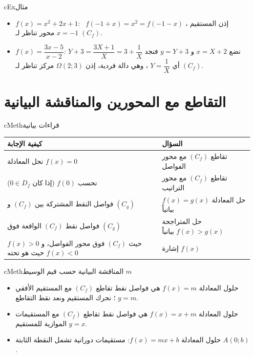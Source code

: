 \documentclass[12pt,a4paper]{article}
\newenvironment{BOX}[2]{\begin{otherlanguage}{english}\begin{arbox}{#1}{#2}}{\end{arbox}\end{otherlanguage}}
\newenvironment{mithal}[1][مثال]{\begin{BOX}{cEx}{#1}}{\end{BOX}}
\newenvironment{tariqa}[1][طريقة]{\begin{BOX}{cMeth}{#1}}{\end{BOX}}
\begin{document}
\begin{mithal}
\begin{itemize}
\item $f(x)=x^2+2x+1$: \ $f(-1+x)=x^2=f(-1-x)$ ، إذن المستقيم $x=-1$ محور تناظر لـ $(C_f)$.
\item $f(x)=\dfrac{3x-5}{x-2}$: نضع $x=X+2$ و $y=Y+3$ فنجد $Y+3=\dfrac{3X+1}{X}=3+\dfrac1X$ أي $Y=\dfrac1X$ ،
وهي دالة فردية، إذن $\Omega(2;3)$ مركز تناظر لـ $(C_f)$.
\end{itemize}
\end{mithal}

\section{التقاطع مع المحورين والمناقشة البيانية}
\begin{tariqa}[قراءات بيانية]
\begin{center}
\renewcommand{\arraystretch}{1.5}
\begin{tabular}{|>{\centering\arraybackslash}m{10.2cm}|>{\centering\arraybackslash}m{5cm}|}\hline
\textbf{كيفية الإجابة} & \textbf{السؤال}\\\hline
نحل المعادلة $f(x)=0$ & تقاطع $(C_f)$ مع محور الفواصل\\\hline
نحسب $f(0)$ (إذا كان $0\in D_f$) & تقاطع $(C_f)$ مع محور التراتيب\\\hline
فواصل النقط المشتركة بين $(C_f)$ و $(C_g)$ & حل المعادلة $f(x)=g(x)$ بيانياً\\\hline
فواصل نقط $(C_f)$ الواقعة فوق $(C_g)$ & حل المتراجحة $f(x)>g(x)$ بيانياً\\\hline
$f(x)>0$ حيث $(C_f)$ فوق محور الفواصل، و $f(x)<0$ حيث هو تحته & إشارة $f(x)$\\\hline
\end{tabular}
\end{center}
\end{tariqa}
\begin{tariqa}[المناقشة البيانية حسب قيم الوسيط $m$]
\begin{itemize}
\item حلول المعادلة $f(x)=m$ هي فواصل نقط تقاطع $(C_f)$ مع المستقيم الأفقي $y=m$ ؛ نحرك المستقيم ونعد نقط التقاطع.
\item حلول المعادلة $f(x)=x+m$ هي فواصل نقط تقاطع $(C_f)$ مع المستقيمات الموازية للمستقيم $y=x$.
\item حلول المعادلة $f(x)=mx+b$: مستقيمات دورانية تشمل النقطة الثابتة $A(0;b)$.
\end{itemize}
\end{tariqa}
\end{document}
